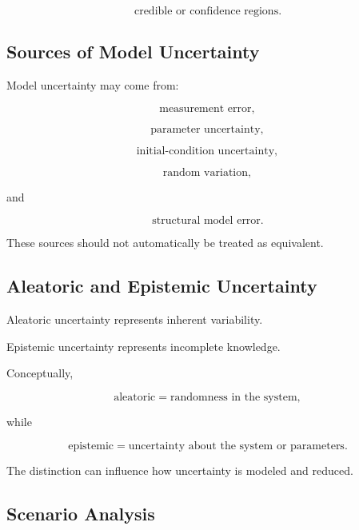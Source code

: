 \[
\boxed{
\text{credible or confidence regions}.
}
\]

\subsection{Sources of Model Uncertainty}
\label{subsec:model-uncertainty-sources}

Model uncertainty may come from:

\[
\boxed{
\text{measurement error},
}
\]

\[
\boxed{
\text{parameter uncertainty},
}
\]

\[
\boxed{
\text{initial-condition uncertainty},
}
\]

\[
\boxed{
\text{random variation},
}
\]

and

\[
\boxed{
\text{structural model error}.
}
\]

These sources should not automatically be treated as equivalent.

\subsection{Aleatoric and Epistemic Uncertainty}
\label{subsec:model-aleatoric-epistemic}

Aleatoric uncertainty represents inherent variability.

Epistemic uncertainty represents incomplete knowledge.

Conceptually,

\[
\boxed{
\text{aleatoric}
=
\text{randomness in the system},
}
\]

while

\[
\boxed{
\text{epistemic}
=
\text{uncertainty about the system or parameters}.
}
\]

The distinction can influence how uncertainty is modeled and reduced.

\subsection{Scenario Analysis}
\label{subsec:model-scenario-analysis}

